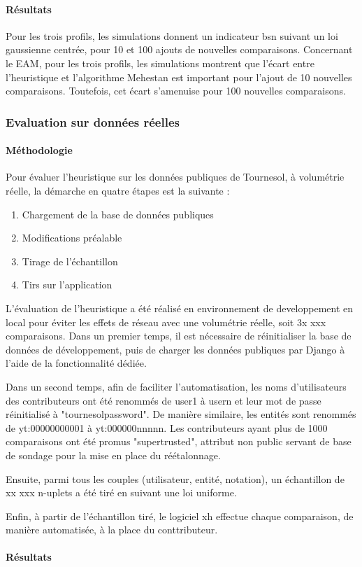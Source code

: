 \paragraph{Résultats}

Pour les trois profils, les simulations donnent un indicateur \gls{bsn} suivant un loi gaussienne centrée, pour 10 et 100 ajouts de nouvelles comparaisons.
Concernant le \gls{EAM}, pour les trois profils, les simulations montrent que l'écart entre l'heuristique et l'algorithme Mehestan est important pour l'ajout de 10 nouvelles comparaisons. Toutefois, cet écart s'amenuise pour 100 nouvelles comparaisons.


\subsubsection{Evaluation sur données réelles}


\paragraph{Méthodologie}

Pour évaluer l'heuristique sur les données publiques de Tournesol, à volumétrie réelle, la démarche en quatre étapes est la suivante :

\begin{enumerate}
    \item Chargement de la base de données publiques
    \item Modifications préalable
    \item Tirage de l'échantillon
    \item Tirs sur l'application
\end{enumerate}
L'évaluation de l'heuristique a été réalisé en environnement de developpement en local pour éviter les effets de réseau avec une volumétrie réelle, soit 3x xxx comparaisons.
Dans un premier temps, il est nécessaire de réinitialiser la base de données de développement, puis de charger les données publiques par Django à l'aide de la fonctionnalité dédiée.

Dans un second temps, afin de faciliter l'automatisation, les noms d'utilisateurs des contributeurs ont été renommés de user1 à usern et leur mot de passe réinitialisé à "tournesolpassword". De manière similaire, les entités sont renommés de yt:00000000001 à yt:000000nnnnn. Les contributeurs ayant plus de 1000 comparaisons ont été promus "supertrusted", attribut non public servant de base de sondage pour la mise en place du réétalonnage.

Ensuite, parmi tous les couples (utilisateur, entité, notation), un échantillon de xx xxx n-uplets a été tiré en suivant une loi uniforme.

Enfin, à partir de l'échantillon tiré, le logiciel xh effectue chaque comparaison, de manière automatisée, à la place du conttributeur.


\paragraph{Résultats}

\pagebreak